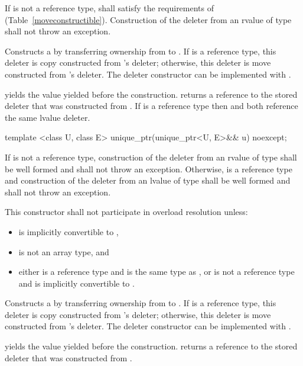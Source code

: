 \begin{itemdescr}
\pnum
\requires If  is not a reference type,
 shall satisfy the requirements of 
(Table~\ref{moveconstructible}).
Construction
of the deleter from an rvalue of type  shall not
throw an exception.

\pnum
\effects Constructs a  by transferring ownership from
 to . If  is a reference type, this
deleter is copy constructed from 's deleter; otherwise, this
deleter is move constructed from 's deleter. \enternote The
deleter constructor can be implemented with . \exitnote

\pnum
\postconditions {} yields the value 
yielded before the construction.  returns a reference
to the stored deleter that was constructed from
. If  is a reference type then
 and  both reference
the same lvalue deleter.
\end{itemdescr}

%
\begin{itemdecl}
template <class U, class E> unique_ptr(unique_ptr<U, E>&& u) noexcept;
\end{itemdecl}

\begin{itemdescr}
\pnum
\requires If  is not a reference type,
construction of the deleter from an rvalue of type
 shall be well formed and shall not throw an exception.
Otherwise,  is a reference type and construction of the deleter from an
lvalue of type  shall be well formed and shall not throw an exception.

\pnum
\remarks This constructor shall not participate in overload resolution unless:

\begin{itemize}
\item {} is implicitly convertible to ,
\item {} is not an array type, and
\item either  is a reference type and  is the same type as , or
 is not a reference type and  is implicitly convertible to .
\end{itemize}

\pnum
\effects Constructs a  by transferring ownership from 
to . If  is a reference type, this deleter is copy constructed from
's deleter; otherwise, this deleter is move constructed from 's
deleter. \enternote The deleter constructor can be implemented with
. \exitnote

\pnum
\postconditions {} yields the value 
yielded before the construction.
 returns a reference
to the stored deleter that was constructed from
.
\end{itemdescr}

